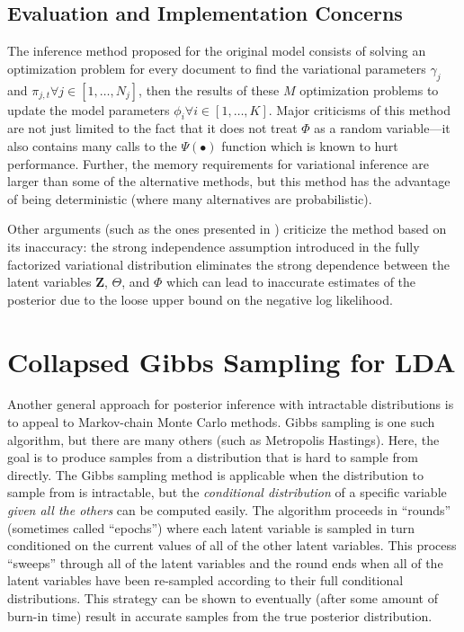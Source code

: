 \documentclass[11pt]{article}
\begin{document}
\subsection{Evaluation and Implementation Concerns}

The inference method proposed for the original model consists of solving an
optimization problem for every document to find the variational parameters
$\gamma_j$ and $\pi_{j,t} \forall j\in[1,\ldots,N_j]$, then the results of
these $M$ optimization problems to update the model parameters
$\phi_i\forall i\in[1,\ldots,K]$. Major criticisms of this method are not
just limited to the fact that it does not treat $\Phi$ as a random
variable---it also contains many calls to the $\Psi(\bullet)$ function
which is known to hurt performance. Further, the memory requirements for
variational inference are larger than some of the alternative methods, but
this method has the advantage of being deterministic (where many
alternatives are probabilistic).

Other arguments (such as the ones presented in \citet{Teh:2007:CVB})
criticize the method based on its inaccuracy: the strong independence
assumption introduced in the fully factorized variational distribution
eliminates the strong dependence between the latent variables $\mathbf{Z}$,
$\Theta$, and $\Phi$ which can lead to inaccurate estimates of the
posterior due to the loose upper bound on the negative log likelihood.

\section{Collapsed Gibbs Sampling for LDA}

Another general approach for posterior inference with intractable
distributions is to appeal to Markov-chain Monte Carlo methods. Gibbs
sampling is one such algorithm, but there are many others (such as
Metropolis Hastings). Here, the goal is to produce samples from a
distribution that is hard to sample from directly. The Gibbs sampling
method is applicable when the distribution to sample from is intractable,
but the \emph{conditional distribution} of a specific variable \emph{given
all the others} can be computed easily. The algorithm proceeds in
``rounds'' (sometimes called ``epochs'') where each latent variable is
sampled in turn conditioned on the current values of all of the other
latent variables. This process ``sweeps'' through all of the latent
variables and the round ends when all of the latent variables have been
re-sampled according to their full conditional distributions. This strategy
can be shown to eventually (after some amount of burn-in time) result in
accurate samples from the true posterior distribution.
\end{document}
